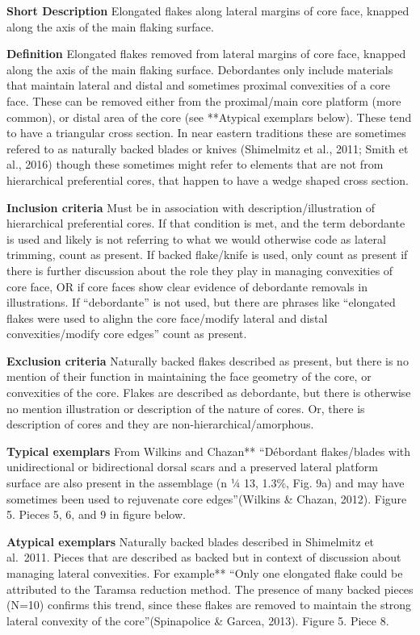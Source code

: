 \documentclass[
]{article}
\begin{document}
\textbf{Short Description} Elongated flakes along lateral margins of
core face, knapped along the axis of the main flaking surface.

\textbf{Definition} Elongated flakes removed from lateral margins of
core face, knapped along the axis of the main flaking surface.
Debordantes only include materials that maintain lateral and distal and
sometimes proximal convexities of a core face. These can be removed
either from the proximal/main core platform (more common), or distal
area of the core (see **Atypical exemplars below). These tend to have a
triangular cross section. In near eastern traditions these are sometimes
refered to as naturally backed blades or knives (Shimelmitz et al.,
2011; Smith et al., 2016) though these sometimes might refer to elements
that are not from hierarchical preferential cores, that happen to have a
wedge shaped cross section.

\textbf{Inclusion criteria} Must be in association with
description/illustration of hierarchical preferential cores. If that
condition is met, and the term debordante is used and likely is not
referring to what we would otherwise code as lateral trimming, count as
present. If backed flake/knife is used, only count as present if there
is further discussion about the role they play in managing convexities
of core face, OR if core faces show clear evidence of debordante
removals in illustrations. If ``debordante'' is not used, but there are
phrases like ``elongated flakes were used to alighn the core face/modify
lateral and distal convexities/modify core edges'' count as present.

\textbf{Exclusion criteria} Naturally backed flakes described as
present, but there is no mention of their function in maintaining the
face geometry of the core, or convexities of the core. Flakes are
described as debordante, but there is otherwise no mention illustration
or description of the nature of cores. Or, there is description of cores
and they are non-hierarchical/amorphous.

\textbf{Typical exemplars} From Wilkins and Chazan** ``Débordant
flakes/blades with unidirectional or bidirectional dorsal scars and a
preserved lateral platform surface are also present in the assemblage (n
¼ 13, 1.3\%, Fig. 9a) and may have sometimes been used to rejuvenate
core edges''(Wilkins \& Chazan, 2012). Figure 5. Pieces 5, 6, and 9 in
figure below.

\textbf{Atypical exemplars} Naturally backed blades described in
Shimelmitz et al.~2011. Pieces that are described as backed but in
context of discussion about managing lateral convexities. For example**
``Only one elongated flake could be attributed to the Taramsa reduction
method. The presence of many backed pieces (N=10) confirms this trend,
since these flakes are removed to maintain the strong lateral convexity
of the core''(Spinapolice \& Garcea, 2013). Figure 5. Piece 8.
\end{document}
